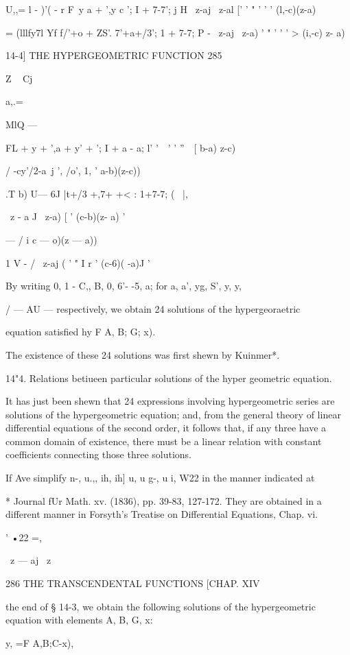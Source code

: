 U,,= l - )'( - r F\ y a + ',y c '; I + 7-7'; j H \ z-aj \ z-al [' ' "
' ' ' (l,-c)(z-a)\

   = (lllfy7l Yf f/'+o + ZS'. 7'+a+/3'; 1 + 7-7; P - \ z-aj \ z-a) ' "
' ' ' > (i,-c) z- a)

14-4] THE HYPERGEOMETRIC FUNCTION 285

Z ~ Cj

a,.=

MlQ —

FL + y + ',a + y' + '; I + a - a; l' '\ \ ' ' ''\ \, [ b-a) z-c)

/ -cy'/2-a\ j ', /o', 1, ' a-b)(z-c))

.T b) U— 6J |t+/3 +,7+ +< : 1+7-7; \;( \ |,

\ z - a J \ z-a) [ ' (c-b)(z- a) '

— / i c — o)(z — a))

1 V - / \ z-aj ( ' " I r ' (c-6)( -a)J '

By writing 0, 1 - C,, B, 0, 6'- -5, a; for a, a', yg, S', y, y,

/ — AU — respectively, we obtain 24 solutions of the hypergeoraetric

equation satisfied hy F A, B; G; x).

The existence of these 24 solutions was first shewn by Kuinmer*.

14"4. Relations betiueen particular solutions of the hyper geometric
equation.

It has just been shewn that 24 expressions involving hypergeometric
series are solutions of the hypergeometric equation; and, from the
general theory of linear differential equations of the second order,
it follows that, if any three have a common domain of existence, there
must be a linear relation with constant coefficients connecting those
three solutions.

If Ave simplify n-, u.,, ih, ih] u, u g-, u i, W22 in the manner
indicated at

* Journal fUr Math. xv. (1836), pp. 39-83, 127-172. They are obtained
in a different manner in Forsyth's Treatise on Differential Equations,
Chap. vi.

' •22 =,

\ z — aj \ z

286 THE TRANSCENDENTAL FUNCTIONS [CHAP. XIV

the end of § 14-3, we obtain the following solutions of the
hypergeometric equation with elements A, B, G, x:

y, =F A,B;C-x),

